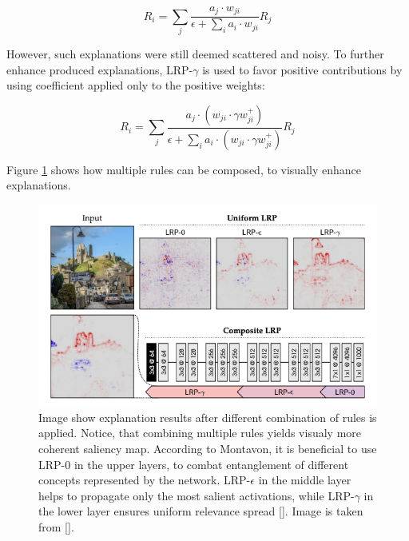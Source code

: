 \begin{equation}
    R_i = \sum_j \frac{a_j \cdot w_{ji}}{\epsilon + \sum_i a_i \cdot w_{ji}} R_j
\end{equation}

However, such explanations were still deemed scattered and noisy. To further enhance produced explanations, LRP-$\gamma$ is used to favor positive contributions by using coefficient applied only to the positive weights:

\begin{equation}
    R_i = \sum_j \frac{a_j \cdot (w_{ji} \cdot \gamma w_{ji}^+)}{\epsilon + \sum_i a_i \cdot (w_{ji} \cdot \gamma w_{ji}^+)} R_j
\end{equation}

Figure \ref{fig:lrp-montavon} shows how multiple rules can be composed, to visually enhance explanations.

\begin{figure}[!h]
    \begin{center}
    \begin{minipage}{1\textwidth}
      \includegraphics[width=\textwidth]{img/lrp-montavon.png}
    \end{minipage}
    \caption{Image show explanation results after different combination of rules is applied. Notice, that combining multiple rules yields visualy more coherent saliency map. According to Montavon, it is beneficial to use LRP-$0$ in the upper layers, to combat entanglement of different concepts represented by the network. LRP-$\epsilon$ in the middle layer helps to propagate only the most salient activations, while LRP-$\gamma$ in the lower layer ensures uniform relevance spread []. Image is taken from [].}
    \label{fig:lrp-montavon}
    \end{center}
\end{figure}